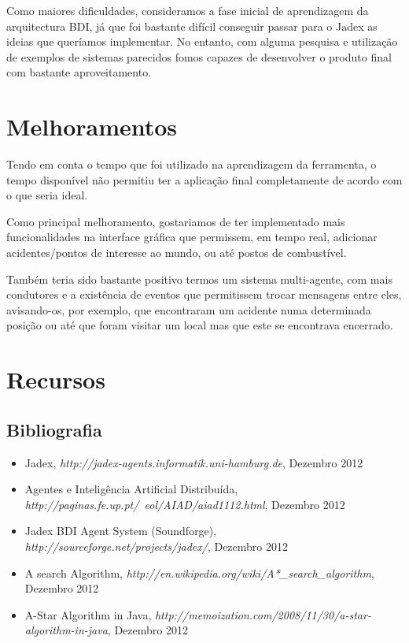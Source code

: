 \documentclass[15pt,a4paper]{article}
\begin{document}
Como maiores dificuldades, consideramos a fase inicial de aprendizagem da arquitectura BDI, já que foi bastante difícil conseguir passar para o Jadex as ideias que queríamos implementar. No entanto, com alguma pesquisa e utilização de exemplos de sistemas parecidos fomos capazes de desenvolver o produto final com bastante aproveitamento.

\newpage
\section{Melhoramentos}

Tendo em conta o tempo que foi utilizado na aprendizagem da ferramenta, o tempo disponível não permitiu ter a aplicação final completamente de acordo com o que seria ideal.

Como principal melhoramento, gostariamos de ter implementado mais funcionalidades na interface gráfica que permissem, em tempo real, adicionar acidentes/pontos de interesse ao mundo, ou até postos de combustível.

Também teria sido bastante positivo termos um sistema multi-agente, com mais condutores e a existência de eventos que permitissem trocar mensagens entre eles, avisando-os, por exemplo, que encontraram um acidente numa determinada posição ou até que foram visitar um local mas que este se encontrava encerrado.

\newpage
\section{Recursos}

\subsection{Bibliografia}

\begin{itemize}
\item Jadex, \emph{http://jadex-agents.informatik.uni-hamburg.de}, Dezembro 2012
\item Agentes e Inteligência Artificial Distribuída, \emph{http://paginas.fe.up.pt/~eol/AIAD/aiad1112.html}, Dezembro 2012
\item Jadex BDI Agent System (Soundforge), \emph{http://sourceforge.net/projects/jadex/}, Dezembro 2012
\item A\* search Algorithm, \emph{http://en.wikipedia.org/wiki/A*\_search\_algorithm}, Dezembro 2012 
\item A-Star Algorithm in Java, \emph{http://memoization.com/2008/11/30/a-star-algorithm-in-java}, Dezembro 2012
\end{itemize}
\end{document}
